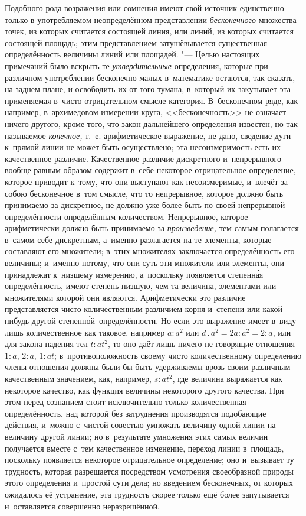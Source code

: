 Подобного рода возражения или сомнения имеют свой источник единственно только в
употребляемом неопределённом представлении {\em бесконечного} множества точек,
из которых считается состоящей линия, или линий, из которых считается состоящей
площадь; этим представлением затушёвывается существенная определённость
величины линий или площадей. "--- Целью настоящих примечаний было вскрыть те
{\em утвердительные} определения, которые при различном употреблении
бесконечно малых в~математике остаются, так сказать, на заднем плане, и
освободить их от того тумана, в~который их закутывает эта применяемая в~чисто
отрицательном смысле категория. В~бесконечном ряде, как например, в~архимедовом
измерении круга, <<бесконечность>> не означает ничего другого, кроме того, что
закон дальнейшего определения известен, но так называемое {\em конечное,} т.~е.
арифметическое выражение, не дано, сведение дуги к~прямой линии не может быть
осуществлено; эта несоизмеримость есть их качественное различие. Качественное
различие дискретного и~непрерывного вообще равным образом содержит в~себе
некоторое отрицательное определение, которое приводит к~тому, что они выступают
как несоизмеримые, и~влечёт за собою бесконечное в~том смысле, что то
непрерывное, которое должно быть принимаемо за дискретное, не должно уже более
быть по своей непрерывной определённости определённым количеством. Непрерывное,
которое арифметически должно быть принимаемо за {\em произведение,} тем самым
полагается в~самом себе дискретным, а~именно разлагается на те элементы,
которые составляют его множители; в~этих множителях заключается определённость
его величины; и~именно потому, что они суть эти множители или элементы, они
принадлежат к~низшему измерению, а~поскольку появляется степенн\'{а}я
определённость, имеют степень низшую, чем та величина, элементами или
множителями которой они являются. Арифметически это различие представляется
чисто количественным различием корня и~степени или какой-нибудь другой
степенн\'{о}й~определённости. Но если это выражение имеет в~виду лишь
количественное как таковое, например $a:a^2$ или $d\,.\,a^2=2a:a^2=2:a$, или
для закона падения тел $t:at^2$, то оно даёт лишь ничего не говорящие отношения
$1:a$, $2:a$, $1:at$; в~противоположность своему чисто количественному
определению члены отношения должны были бы быть удерживаемы врозь своим
различным качественным значением, как, например, $s:at^2$, где величина
выражается как некоторое качество, как функция величины некоторого другого
качества. При этом перед сознанием стоит исключительно только количественная
определённость, над которой без затруднения производятся подобающие действия,
и~можно с~чистой совестью умножать величину одной линии на величину другой
линии; но в~результате умножения этих самых величин получается вместе с~тем
качественное изменение, переход линии в~площадь, поскольку появляется некоторое
отрицательное определение; оно и~вызывает ту трудность, которая разрешается
посредством усмотрения своеобразной природы этого определения и~простой сути
дела; но введением бесконечных, от которых ожидалось её устранение, эта
трудность скорее только ещё более запутывается и~оставляется совершенно
неразрешённой.

